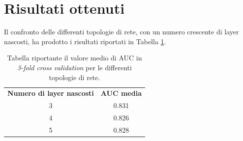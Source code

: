 \section{Risultati ottenuti}
Il confronto delle differenti topologie di rete, con un numero crescente di layer nascosti, ha prodotto i risultati riportati in Tabella \ref{tab:topology}.
\begin{table}
	\centering
	\caption{Tabella riportante il valore medio di AUC in \textit{3-fold cross validation} per le differenti topologie di rete.}
	\begin{tabular}{c|c}
		\label{tab:topology}
		\textbf{Numero di layer nascosti} & \textbf{AUC media} \\
		3 & 0.831 \\ 
		4 & 0.826 \\ 
		5 & 0.828 \\
	\end{tabular}
\end{table}

